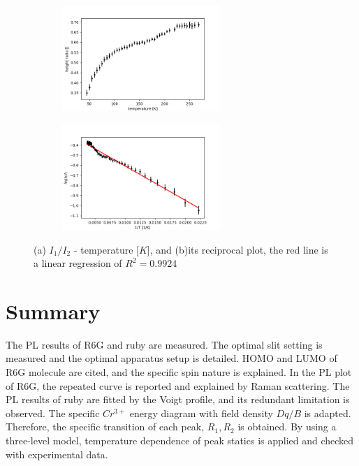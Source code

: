 \documentclass{article}
\begin{document}
\begin{figure}[ht]
  \centering
  \begin{subfigure}[b]{6cm}
    \centering
    \includegraphics[width=6cm]{../results/Ruby_temperature_height_ratio_fig.png}
    \caption{}
  \end{subfigure}
  \hfill
  \begin{subfigure}[b]{6cm}
      \centering
      \includegraphics[width=6cm]{../results/Ruby_temperature_height_ratio_loglog_fig.png}
      \caption{}
  \end{subfigure}
  \caption{(a) $I_1/I_2$ - temperature [$K$], and (b)its reciprocal plot, the red line is a linear regression of $R^2 = 0.9924$}
  \label{fig: ruby_temperature_height_ratio}
 \end{figure}

\section{Summary}
The PL results of R6G and ruby are measured.
The optimal slit setting is measured and the optimal apparatus setup is detailed.
HOMO and LUMO of R6G molecule are cited, and the specific spin nature is explained.
In the PL plot of R6G, the repeated curve is reported and explained by Raman scattering.
The PL results of ruby are fitted by the Voigt profile, and its redundant limitation is observed.
The specific $Cr^{3+}$ energy diagram with field density $Dq/B$ is adapted.
Therefore, the specific transition of each peak, $R_1, R_2$ is obtained.
By using a three-level model, temperature dependence of peak statics is applied and checked with experimental data.

 
 


\end{document}
